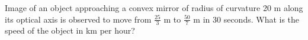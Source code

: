 
\item Image of an object approaching a convex mirror of radius of curvature 20 m along its optical axis is observed to move from $\frac{25}{3}$ m to $\frac{50}{7}$ m in 30 seconds. What is the speed of the object in km per hour?

